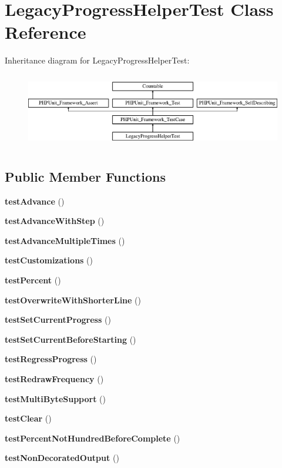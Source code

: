 \section{Legacy\+Progress\+Helper\+Test Class Reference}
\label{class_symfony_1_1_component_1_1_console_1_1_tests_1_1_helper_1_1_legacy_progress_helper_test}
Inheritance diagram for Legacy\+Progress\+Helper\+Test\+:\begin{figure}[H]
\begin{center}
\leavevmode
\includegraphics[height=3.303835cm]{class_symfony_1_1_component_1_1_console_1_1_tests_1_1_helper_1_1_legacy_progress_helper_test}
\end{center}
\end{figure}
\subsection*{Public Member Functions}
\begin{DoxyCompactItemize}
\item 
{\bf test\+Advance} ()
\item 
{\bf test\+Advance\+With\+Step} ()
\item 
{\bf test\+Advance\+Multiple\+Times} ()
\item 
{\bf test\+Customizations} ()
\item 
{\bf test\+Percent} ()
\item 
{\bf test\+Overwrite\+With\+Shorter\+Line} ()
\item 
{\bf test\+Set\+Current\+Progress} ()
\item 
{\bf test\+Set\+Current\+Before\+Starting} ()
\item 
{\bf test\+Regress\+Progress} ()
\item 
{\bf test\+Redraw\+Frequency} ()
\item 
{\bf test\+Multi\+Byte\+Support} ()
\item 
{\bf test\+Clear} ()
\item 
{\bf test\+Percent\+Not\+Hundred\+Before\+Complete} ()
\item 
{\bf test\+Non\+Decorated\+Output} ()
\end{DoxyCompactItemize}
